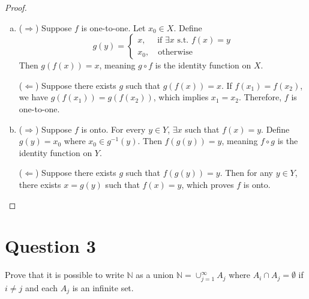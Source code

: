 \documentclass{article}
\newcommand{\N}{\mathbb{N}}
\begin{document}
\begin{proof}
$ $\\
\begin{enumerate}[(a)]
  \item ($\Rightarrow$) Suppose $f$ is one-to-one. Let $x_0 \in X$. Define
        \[ g(y) = \begin{cases}
              x,\quad \textrm{ if } \exists x \textrm{ s.t. } f(x)=y \\
              x_0,\quad \textrm{otherwise}
           \end{cases}
        \]
        Then $g(f(x)) = x$, meaning $g \circ f$ is the identity function on $X$.

        ($\Leftarrow$) Suppose there exists $g$ such that $g(f(x)) = x$.
        If $f(x_1) = f(x_2)$, we have $g(f(x_1)) = g(f(x_2))$, which implies
        $x_1 = x_2$. Therefore, $f$ is one-to-one.

  \item ($\Rightarrow$) Suppose $f$ is onto. For every $y \in Y$, $\exists x$
        such that $f(x) = y$. Define $g(y) = x_0$ where $x_0 \in g^{-1}(y)$.
        Then $f(g(y))=y$, meaning $f \circ g$ is the identity function on $Y$.

        ($\Leftarrow$) Suppose there exists $g$ such that $f(g(y)) = y$.
        Then for any $y \in Y$, there exists $x = g(y)$ such that $f(x)=y$,
        which proves $f$ is onto.
\end{enumerate}
\end{proof}


\section*{Question 3}
Prove that it is possible to write $\N$ as a union $\N = \cup_{j=1}^{\infty} A_j$
where $A_i \cap A_j = \emptyset$ if $i\neq j$ and each $A_j$ is an infinite set.\\
\end{document}
